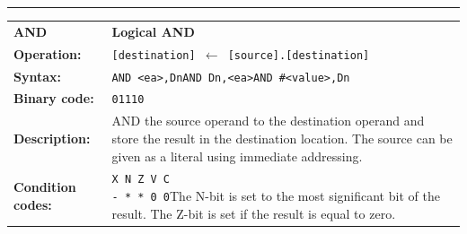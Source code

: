 \documentclass[]{article}
\begin{document}
\begin{appendices}
\noindent\rule{10cm}{1pt}\newline %
\setlength\extrarowheight{5pt} %
\begin{tabularx}{\textwidth}{lL}
  {\Large \textbf{AND}} 	& {\Large \textbf{Logical AND}}\\
  \textbf{Operation:} 		& \texttt{[destination] $\leftarrow$ [source].[destination]}\\
  \textbf{Syntax:}  		& \texttt{AND <ea>,Dn}\newline\texttt{AND Dn,<ea>}\newline\texttt{AND \#<value>,Dn}\\
  \textbf{Binary code:} 	& \texttt{01110}\\
  \textbf{Description:}  	& AND the source operand to the destination operand and store the
result in the destination location. The source can be given as a literal using immediate addressing.\\
  \textbf{Condition codes:} & \texttt{X N Z V C\newline - * * 0 0}\newline\newline The N-bit is set to the most significant bit of the result. The Z-bit is set if the result is equal to zero.\\
\end{tabularx}
\newline

\newpage


\end{appendices}
\end{document}
